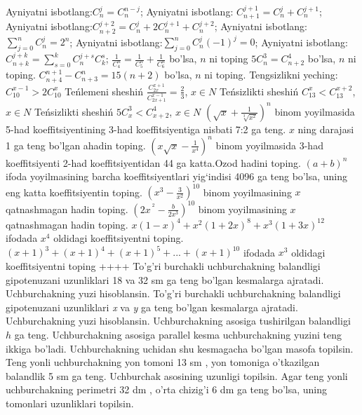 Ayniyatni isbotlang:\(C_{n}^{j} = C_{n}^{n - j}\);
Ayniyatni isbotlang: \(C_{n + 1}^{j + 1} = C_{n}^{j} + C_{n}^{j + 1}\);
Ayniyatni isbotlang:\(C_{n + 2}^{j + 2} = C_{n}^{j} + 2C_{n}^{j + 1} + C_{n}^{j + 2}\);
Ayniyatni isbotlang: \(\sum_{j = 0}^{n}C_{n}^{j} = 2^{n}\);
Ayniyatni isbotlang:\(\sum_{j = 0}^{n}C_{n}^{j}( - 1)^{j} = 0\);
Ayniyatni isbotlang: \(C_{n + k}^{j + k} = \sum_{s = 0}^{k}C_{n}^{j + s}C_{k}^{s}\);
\(\frac{1}{C_{4}^{n}} = \frac{1}{C_{5}^{n}} + \frac{1}{C_{6}^{n}}\) bo'lsa, \(n\) ni toping
\(5C_{n}^{3} = C_{n + 2}^{4}\) bo'lsa, \(n\) ni toping.
\(C_{n + 4}^{n + 1} - C_{n + 3}^{n} = 15(n + 2)\) bo'lsa, \(n\) ni toping.
Tengsizlikni yeching: \(C_{10}^{x - 1} > 2C_{10}^{x}\)
Teńlemeni sheshiń \(\frac{C_{2x}^{x + 1}}{C_{2x + 1}^{x - 1}} = \frac{2}{3}\), \(x \in N\)
Teńsizlikti sheshiń \(C_{13}^{x} < C_{13}^{x + 2}\), \(x \in N\)
Teńsizlikti sheshiń \(5C_{x}^{3} < C_{x + 2}^{4}\), \(x \in N\)
\(\left( \sqrt{x} + \frac{1}{\sqrt[3]{x^{2}}} \right)^{n}\) binom yoyilmasida 5-had koeffitsiyentining 3-had koeffitsiyentiga nisbati 7:2 ga teng. \(x\) ning darajasi 1 ga teng bo'lgan ahadin toping.
\(\left( x\sqrt{x} - \frac{1}{x^{4}} \right)^{n}\) binom yoyilmasida 3-had koeffitsiyenti 2-had koeffitsiyentidan 44 ga katta.Ozod hadini toping.
\((a + b)^{n}\) ifoda yoyilmasining barcha koeffitsiyentlari yig`indisi 4096 ga teng bo'lsa, uning eng katta koeffitsiyentin toping.
\(\left( x^{3} - \frac{3}{x^{2}} \right)^{10}\) binom yoyilmasining \(x\) qatnashmagan hadin toping.
\(\left( 2x^{\ ^{2}} - \frac{b}{2x^{3}} \right)^{10}\) binom yoyilmasining \(x\) qatnashmagan hadin toping.
\(x(1 - x)^{4} + x^{2}(1 + 2x)^{8} + x^{3}(1 + 3x)^{12}\) ifodada \(x^{4}\) oldidagi koeffitsiyentni toping.
\((x + 1)^{3} + (x + 1)^{4} + (x + 1)^{5} + ... + (x + 1)^{10}\) ifodada \(x^{3}\) oldidagi koeffitsiyentni toping
++++
To'g'ri burchakli uchburchakning balandligi gipotenuzani uzunliklari 18 va 32 sm ga teng bo'lgan kesmalarga ajratadi. Uchburchakning yuzi hisoblansin.
To'g'ri burchakli uchburchakning balandligi gipotenuzani uzunliklari \emph{x} va \emph{y} ga teng bo'lgan kesmalarga ajratadi. Uchburchakning yuzi hisoblansin.
Uchburchakning asosiga tushirilgan balandligi \(h\) ga teng. Uchburchakning asosiga parallel kesma uchburchakning yuzini teng ikkiga bo'ladi. Uchburchakning uchidan shu kesmagacha bo'lgan masofa topilsin.
Teng yonli uchburchakning yon tomoni 13 sm , yon tomoniga o'tkazilgan balandlik 5 sm ga teng. Uchburchak asosining uzunligi topilsin.
Agar teng yonli uchburchakning perimetri 32 dm , o'rta chizig'i 6 dm ga teng bo'lsa, uning tomonlari uzunliklari topilsin.
